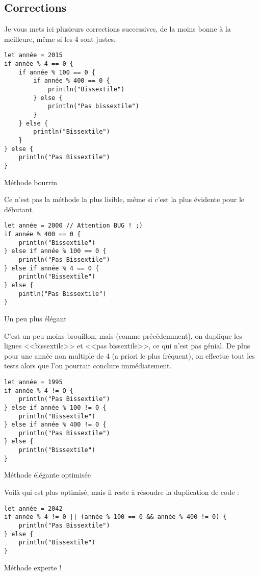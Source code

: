 \subsection{Corrections}
Je vous mets ici plusieurs corrections successives,
de la moins bonne à la meilleure, même si les 4 sont justes.

\begin{listing}[h!]
\begin{verbatim}
let année = 2015
if année % 4 == 0 {
    if année % 100 == 0 {
        if année % 400 == 0 {
            println("Bissextile")
        } else {
            println("Pas bissextile")
        }
    } else {
        println("Bissextile")
    }
} else {
    println("Pas Bissextile")
}
\end{verbatim}
\caption{Méthode bourrin}
\end{listing}
Ce n'est pas la méthode la plus lisible,
même si c'est la plus évidente pour le débutant.

\begin{listing}[h!]
\begin{verbatim}
let année = 2000 // Attention BUG ! ;)
if année % 400 == 0 {
    println("Bissextile")
} else if année % 100 == 0 {
    println("Pas Bissextile")
} else if année % 4 == 0 {
    println("Bissextile")
} else {
    pintln("Pas Bissextile")
}
\end{verbatim}
\caption{Un peu plus élégant}
\end{listing}
C'est un peu moins brouillon, mais (comme précédemment), on duplique les lignes <<bissextile>> et <<pas bissextile>>, ce qui n'est pas génial. De plus pour une année non multiple de 4 (a priori le plus fréquent), on effectue tout les tests alors que l'on pourrait conclure immédiatement.

\begin{listing}[h!]
\begin{verbatim}
let année = 1995
if année % 4 != O {
    println("Pas Bissextile")
} else if année % 100 != 0 {
    println("Bissextile")
} else if année % 400 != 0 {
    println("Pas Bissextile")
} else {
    println("Bissextile")
}
\end{verbatim}
\caption{Méthode élégante optimisée}
\end{listing}
Voilà qui est plus optimisé, mais il reste à résoudre la duplication de code :

\begin{listing}[h!]
\begin{verbatim}
let année = 2042
if année % 4 != 0 || (année % 100 == 0 && année % 400 != 0) {
    println("Pas Bissextile")
} else {
    println("Bissextile")
}
\end{verbatim}
\caption{Méthode experte !}
\end{listing}

